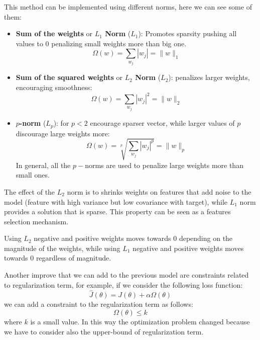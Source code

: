This method can be implemented using different norms, here we can see some of them:
\begin{itemize}
    \item \textbf{Sum of the weights} or \textbf{$L_1$ Norm} ($L_1$): Promotes
          sparsity pushing all values to $0$ penalizing small weights more than big one.
          \begin{equation}
              \Omega(w) = \sum_{w_j}|w_j| = \|w\|_1
          \end{equation}
    \item \textbf{Sum of the squared weights} or \textbf{$L_2$ Norm} ($L_2$):
          penalizes larger weights, encouraging smoothness:
          \begin{equation}
              \Omega(w) = \sum_{w_j}|w_j|^2 = \|w\|_2
          \end{equation}
    \item \textbf{$p$-norm} ($L_p$): for $p < 2$ encourage sparser vector, while
          larger values of $p$ discourage large weights more:
          \begin{equation}
              \Omega(w) = \sqrt[p]{\sum_{w_j}|w_j|^p} = \|w\|_p
          \end{equation}
          In general, all the $p-$norms are used to penalize large weights more
          than small ones.
\end{itemize}

The effect of the $L_2$ norm is to shrinks weights on features that add noise to
the model (feature with high variance but low covariance with target), while
$L_1$ norm provides a solution that is sparse. This property can be seen as a
features selection mechanism.
\begin{note}
    Using $L_2$ negative and positive weights moves towards 0 depending on the
    magnitude of the weights, while using $L_1$ negative and positive weights
    moves towards 0 regardless of magnitude.
\end{note}

Another improve that we can add to the previous model are constraints related to
regularization term, for example, if we consider the following loss function:
\begin{equation}
    \hat{J}(\theta) = J(\theta) + \alpha \Omega(\theta)
\end{equation}
we can add a constraint to the regularization term as follows:
\begin{equation}
    \Omega(\theta) \le k
\end{equation}
where $k$ is a small value. In this way the optimization problem changed because
we have to consider also the upper-bound of regularization term.

